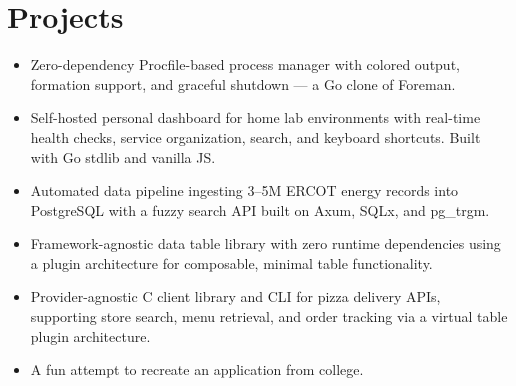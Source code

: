\section{Projects}

\begin{itemize}
  \item Zero-dependency Procfile-based process manager with colored output, formation support,
        and graceful shutdown — a Go clone of Foreman.
\end{itemize}
\vspace{0.75em}

\begin{itemize}
  \item Self-hosted personal dashboard for home lab environments with real-time health checks,
        service organization, search, and keyboard shortcuts. Built with Go stdlib and vanilla JS.
\end{itemize}
\vspace{0.75em}

\begin{itemize}
  \item Automated data pipeline ingesting 3--5M ERCOT energy records into PostgreSQL with a
        fuzzy search API built on Axum, SQLx, and pg\_trgm.
\end{itemize}
\vspace{0.75em}

\begin{itemize}
  \item Framework-agnostic data table library with zero runtime dependencies using a
        plugin architecture for composable, minimal table functionality.
\end{itemize}
\vspace{0.75em}

\begin{itemize}
  \item Provider-agnostic C client library and CLI for pizza delivery APIs, supporting store
        search, menu retrieval, and order tracking via a virtual table plugin architecture.
  \item A fun attempt to recreate an application from college.
\end{itemize}

